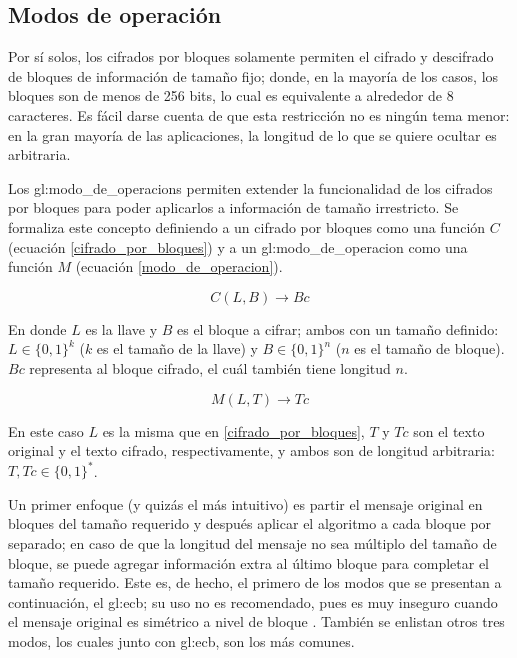 %
%

\subsection{Modos de operación}

Por sí solos, los cifrados por bloques solamente permiten el cifrado y
descifrado de bloques de información de tamaño fijo; donde, en la mayoría de
los casos, los bloques son de menos de 256 bits\cite{modos_de_operacion}, lo
cual es equivalente a alrededor de 8 caracteres. Es fácil darse cuenta de que
esta restricción no es ningún tema menor: en la gran mayoría de las
aplicaciones, la longitud de lo que se quiere ocultar es arbitraria.

Los \glspl{gl:modo_de_operacion} permiten extender la funcionalidad de los
cifrados por bloques para poder aplicarlos a información de tamaño irrestricto.
Se formaliza este concepto definiendo a un cifrado por bloques como una función
$ C $ (ecuación \ref{cifrado_por_bloques}) y a un \gls{gl:modo_de_operacion}
como una función $ M $ (ecuación \ref{modo_de_operacion}).

\begin{equation}
  \label{cifrado_por_bloques}
  C(L, B) \rightarrow Bc
\end{equation}

En donde $ L $ es la llave y $ B $ es el bloque a cifrar; ambos con un tamaño
definido: $ L \in \{0, 1\}^k $ ($ k $ es el tamaño de la llave) y
$ B \in \{0, 1\}^n $ ($ n $ es el tamaño de bloque). $ Bc $ representa al
bloque cifrado, el cuál también tiene longitud $ n $.

\begin{equation}
  \label{modo_de_operacion}
  M(L, T) \rightarrow Tc
\end{equation}

En este caso $ L $ es la misma que en \ref{cifrado_por_bloques}, $ T $ y
$ Tc $ son el texto original y el texto cifrado, respectivamente, y ambos
son de longitud arbitraria: $ T, Tc \in \{0, 1\}^* $.

Un primer enfoque (y quizás el más intuitivo) es partir el mensaje original
en bloques del tamaño requerido y después aplicar el algoritmo a cada bloque
por separado; en caso de que la longitud del mensaje no sea múltiplo del
tamaño de bloque, se puede agregar información extra al último bloque para
completar el tamaño requerido. Este es, de hecho, el primero de los modos que
se presentan a continuación, el \acrfull{gl:ecb}; su uso no es
recomendado, pues es muy inseguro cuando el mensaje original es simétrico a
nivel de bloque \cite{modos_de_operacion}. También se enlistan otros tres
modos, los cuales junto con \acrshort{gl:ecb}, son los más comunes.






